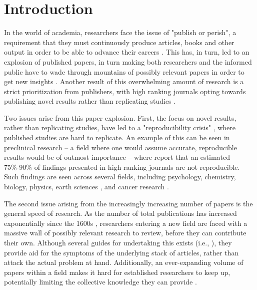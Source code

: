 \section{Introduction}
In the world of academia, researchers face the issue of "publish or perish", a requirement that they must continuously produce articles, books and other output in order to be able to advance their careers \parencite{Grimes_2018}. This has, in turn, led to an explosion of published papers, in turn making both researchers and the informed public have to wade through mountains of possibly relevant papers in order to get new insights \parencite{Bornmann_2015}. Another result of this overwhelming amount of research is a strict prioritization from publishers, with high ranking journals opting towards publishing novel results rather than replicating studies \parencite{Grimes_2018}.

Two issues arise from this paper explosion. First, the focus on novel results, rather than replicating studies, have led to a "reproducibility crisis" \parencite{Begley_2015}, where published studies are hard to replicate. An example of this can be seen in preclinical research -- a field where one would assume accurate, reproducible results would be of outmost importance -- where \textcite[p.1]{Begley_2015} report that an estimated 75\%-90\% of findings presented in high ranking journals are not reproducible. Such findings are seen across several fields, including psychology, chemistry, biology, physics, earth sciences \parencite{Baker_2016}, and cancer research \parencite{fMRI_no_author}. %

The second issue arising from the increasingly increasing number of papers is the general speed of research. As the number of total publications has increased exponentially since the 1600s \parencite{Bornmann_2015}, researchers entering a new field are faced with a massive wall of possibly relevant research to review, before they can contribute their own. Although several guides for undertaking this exists (i.e., \cite{Okoli_2015,Popenoe_2021,Nightingale_2009}), they provide aid for the symptoms of the underlying stack of articles, rather than attack the actual problem at hand. Additionally, an ever-expanding volume of papers within a field makes it hard for established researchers to keep up, potentially limiting the collective knowledge they can provide \parencite{Davies_2017}.

